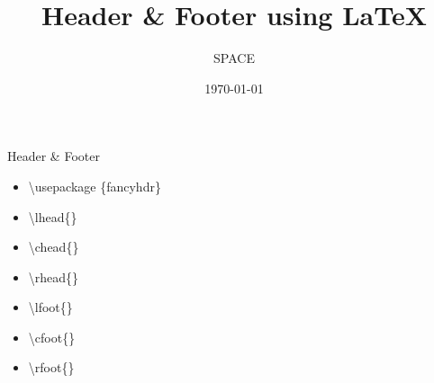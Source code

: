 \documentclass{beamer}
\author{SPACE}
\title{Header \& Footer using \LaTeX}
\date{\today}
\begin{document}
\maketitle
\begin{frame}{Header \& Footer}
\begin{itemize}
\item[] \textbackslash usepackage \{fancyhdr\}
\end{itemize}
\begin{itemize}
\item \textbackslash lhead\{\}
\item \textbackslash chead\{\}
\item \textbackslash rhead\{\}
\item \textbackslash lfoot\{\}
\item \textbackslash cfoot\{\}
\item \textbackslash rfoot\{\}
\end{itemize}
\end{frame}
\end{document}
